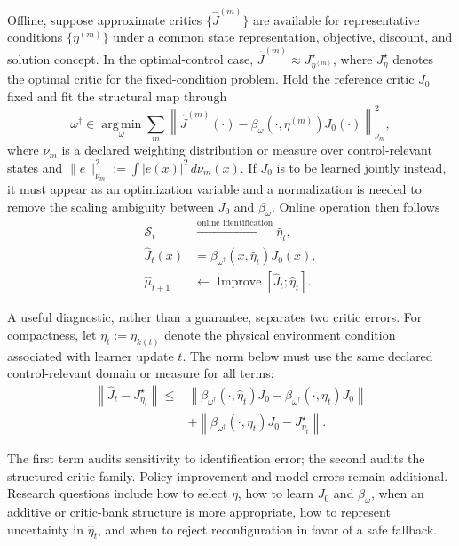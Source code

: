 \documentclass[a4paper]{article}
\begin{document}
Offline, suppose approximate critics $\{\widehat J^{(m)}\}$ are available for
representative conditions $\{\eta^{(m)}\}$ under a common state representation,
objective, discount, and solution concept. In the optimal-control case,
$\widehat J^{(m)}\approx J_{\eta^{(m)}}^\star$, where $J_\eta^\star$ denotes
the optimal critic for the fixed-condition problem. Hold the reference critic
$J_0$ fixed and fit the structural map through
\begin{equation}
  \omega^\dagger
  \in
  \operatorname*{arg\,min}_{\omega}
  \sum_m
  \left\|
  \widehat J^{(m)}(\cdot)
  -
  \beta_\omega(\cdot,\eta^{(m)})J_0(\cdot)
  \right\|_{\nu_m}^{2},
\end{equation}
where $\nu_m$ is a declared weighting distribution or measure over
control-relevant states and
$\|e\|_{\nu_m}^2:=\int |e(x)|^2\,d\nu_m(x)$. If $J_0$ is to be learned jointly
instead, it must appear as an optimization variable and a normalization is
needed to remove the scaling ambiguity between $J_0$ and $\beta_\omega$.
Online operation then follows
\begin{equation}
  \begin{aligned}
    \mathcal S_t
    &\xrightarrow{\text{online identification}}
    \widehat\eta_t,\\
    \widehat J_t(x)
    &=\beta_{\omega^\dagger}(x,\widehat\eta_t)J_0(x),\\
    \widehat\mu_{t+1}
    &\leftarrow
    \operatorname{Improve}
    \!\left[\widehat J_t;\widehat\eta_t\right].
  \end{aligned}
\end{equation}

A useful diagnostic, rather than a guarantee, separates two critic errors.
For compactness, let $\eta_t:=\eta_{k(t)}$ denote the physical environment
condition associated with learner update $t$. The norm below must use the same
declared control-relevant domain or measure for all terms:
\begin{equation}
  \begin{aligned}
    \left\|\widehat J_t-J_{\eta_t}^{\star}\right\|
    \le {}&
    \left\|
    \beta_{\omega^\dagger}(\cdot,\widehat\eta_t)J_0
    -\beta_{\omega^\dagger}(\cdot,\eta_t)J_0
    \right\|\\
    &+
    \left\|
    \beta_{\omega^\dagger}(\cdot,\eta_t)J_0
    -J_{\eta_t}^{\star}
    \right\|.
  \end{aligned}
\end{equation}

The first term audits sensitivity to identification error; the second audits
the structured critic family. Policy-improvement and model errors remain
additional. Research questions include how to select $\eta$, how to learn
$J_0$ and $\beta_\omega$, when an additive or critic-bank structure is more
appropriate, how to represent uncertainty in $\widehat\eta_t$, and when to
reject reconfiguration in favor of a safe fallback.
\end{document}
